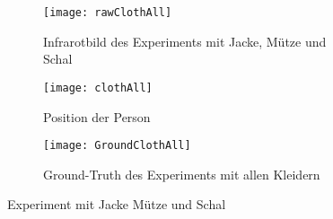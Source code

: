 \begin{figure}[H]
	\begin{subfigure}{.45\linewidth}
		\centering
		\texttt{[image: rawClothAll]}
		\caption{Infrarotbild des Experiments mit Jacke, Mütze und Schal}
		\label{fig:rawClothAll}
	\end{subfigure}\hfill%
	\begin{subfigure}{.45\linewidth}
		\centering
		\texttt{[image: clothAll]}
		\caption{Position der Person}
		\label{fig:AlgorithmsClothAll}
	\end{subfigure}\hfill%
	\begin{subfigure}{\linewidth}
		\centering
		\texttt{[image: GroundClothAll]}
		\caption{Ground-Truth des Experiments mit allen Kleidern}
		\label{fig:groundTruthClothAll}
	\end{subfigure}
	\caption{Experiment mit Jacke Mütze und Schal}
	\label{fig:AllCloth}
\end{figure}

